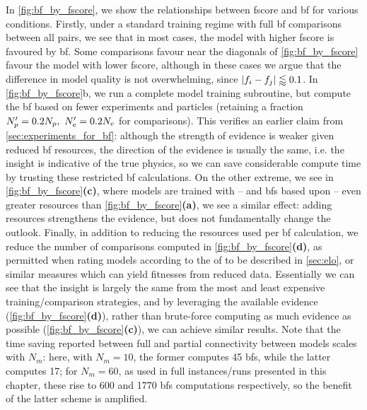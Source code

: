 In \cref{fig:bf_by_fscore}, we show the relationships between \gls{fscore} and \gls{bf} for various conditions. 
Firstly, under a standard training regime with full \gls{bf} comparisons between all pairs, 
    we see that in most cases, the model with higher \gls{fscore} is favoured by \gls{bf}.
Some comparisons favour near the diagonals of \cref{fig:bf_by_fscore} favour the model with lower \gls{fscore}, 
    although in these cases we argue that the difference in model quality is not overwhelming, 
    since $\left\lvert f_i - f_j \right\rvert \lessapprox 0.1$. 
In \cref{fig:bf_by_fscore}b, we run a complete model training subroutine, but compute the \gls{bf} based on fewer \glspl{experiment} and \glspl{particle} 
    (retaining a fraction $N_p^{\prime} = 0.2N_p, \ N_e^{\prime} = 0.2N_e$ for comparisons).
This verifies an earlier claim from \cref{sec:experiments_for_bf}: 
    although the strength of evidence is weaker given reduced \gls{bf} resources, 
    the direction of the evidence is usually the same, i.e. the insight is indicative of the true physics, 
    so we can save considerable compute time by trusting these restricted \gls{bf} calculations. 
On the other extreme, we see in \cref{fig:bf_by_fscore}\textbf{(c)}, where models are trained with
    -- and \glspl{bf} based upon -- even greater resources than \cref{fig:bf_by_fscore}\textbf{(a)}, we see a similar effect: 
    adding resources strengthens the evidence, but does not fundamentally change the outlook. 
Finally, in addition to reducing the resources used per \gls{bf} calculation, 
    we reduce the number of comparisons computed in \cref{fig:bf_by_fscore}\textbf{(d)}, 
    as permitted when rating models according to the \gls{of} to be described in \cref{sec:elo}, 
    or similar measures which can yield fitnesses from reduced data. 
Essentially we can see that the insight is largely the same 
    from the most and least expensive training/comparison strategies, 
    and by leveraging the available evidence (\cref{fig:bf_by_fscore}\textbf{(d)}), 
    rather than brute-force computing as much evidence as possible (\cref{fig:bf_by_fscore}\textbf{(c)}), 
    we can achieve similar results. 
Note that the time saving reported between full and partial connectivity between models scales with $N_m$: 
    here, with $N_m=10$, the former computes 45 \glspl{bf}, while the latter computes 17;
    for $N_m=60$, as used in full instances/runs presented in this chapter, 
    these rise to 600 and 1770 \glspl{bf} computations respectively, 
    so the benefit of the latter scheme is amplified. 

